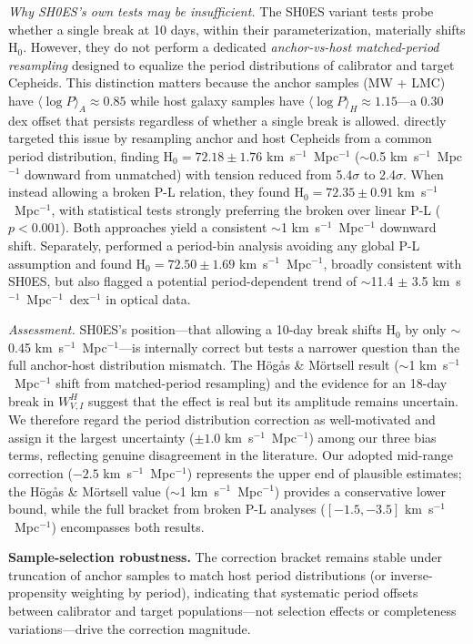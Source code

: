 \documentclass[preprint, linenumbers]{aastex701}
\begin{document}
\textit{Why SH0ES's own tests may be insufficient.} The SH0ES variant tests probe whether a single break at 10 days, within their parameterization, materially shifts H$_0$. However, they do not perform a dedicated \textit{anchor-vs-host matched-period resampling} designed to equalize the period distributions of calibrator and target Cepheids. This distinction matters because the anchor samples (MW + LMC) have $\langle \log P \rangle_A \approx 0.85$ while host galaxy samples have $\langle \log P \rangle_H \approx 1.15$---a 0.30 dex offset that persists regardless of whether a single break is allowed. \citet{Hogas2025} directly targeted this issue by resampling anchor and host Cepheids from a common period distribution, finding H$_0 = 72.18 \pm 1.76$ km~s$^{-1}$~Mpc$^{-1}$ ($\sim$0.5 km~s$^{-1}$~Mpc$^{-1}$ downward from unmatched) with tension reduced from 5.4$\sigma$ to 2.4$\sigma$. When instead allowing a broken P-L relation, they found H$_0 = 72.35 \pm 0.91$ km~s$^{-1}$~Mpc$^{-1}$, with statistical tests strongly preferring the broken over linear P-L ($p < 0.001$). Both approaches yield a consistent $\sim$1 km~s$^{-1}$~Mpc$^{-1}$ downward shift. Separately, \citet{Wojtak2024} performed a period-bin analysis avoiding any global P-L assumption and found H$_0 = 72.50 \pm 1.69$ km~s$^{-1}$~Mpc$^{-1}$, broadly consistent with SH0ES, but also flagged a potential period-dependent trend of $\sim$11.4 $\pm$ 3.5 km~s$^{-1}$~Mpc$^{-1}$~dex$^{-1}$ in optical data.

\textit{Assessment.} SH0ES's position---that allowing a 10-day break shifts H$_0$ by only $\sim$0.45 km~s$^{-1}$~Mpc$^{-1}$---is internally correct but tests a narrower question than the full anchor-host distribution mismatch. The H\"og\aa{}s \& M\"ortsell result ($\sim$1 km~s$^{-1}$~Mpc$^{-1}$ shift from matched-period resampling) and the \citet{Bhardwaj2016} evidence for an 18-day break in $W^H_{V,I}$ suggest that the effect is real but its amplitude remains uncertain. We therefore regard the period distribution correction as well-motivated and assign it the largest uncertainty ($\pm 1.0$ km~s$^{-1}$~Mpc$^{-1}$) among our three bias terms, reflecting genuine disagreement in the literature. Our adopted mid-range correction ($-2.5$ km~s$^{-1}$~Mpc$^{-1}$) represents the upper end of plausible estimates; the H\"og\aa{}s \& M\"ortsell value ($\sim$1 km~s$^{-1}$~Mpc$^{-1}$) provides a conservative lower bound, while the full bracket from broken P-L analyses ($[-1.5, -3.5]$ km~s$^{-1}$~Mpc$^{-1}$) encompasses both results.

\textbf{Sample-selection robustness.} The correction bracket remains stable under truncation of anchor samples to match host period distributions (or inverse-propensity weighting by period), indicating that systematic period offsets between calibrator and target populations---not selection effects or completeness variations---drive the correction magnitude.
\end{document}
